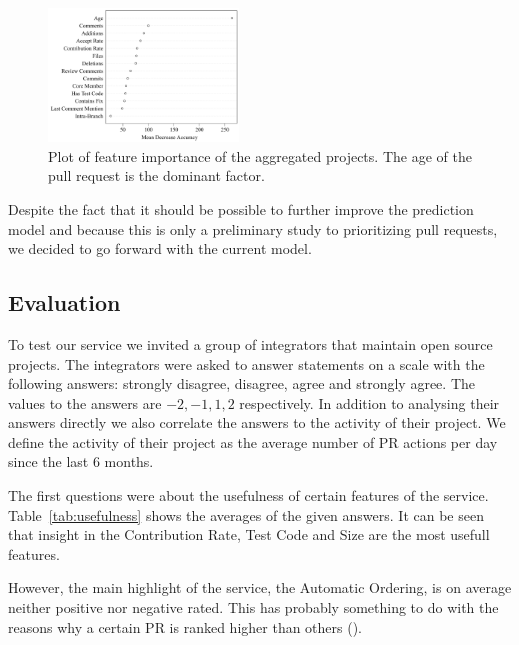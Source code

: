 \documentclass[conference]{IEEEtran}
\begin{document}
\begin{figure}
  \centering
  \includegraphics[width=0.45\textwidth]{../figs/mean-decrease-accuracy.pdf}
  \caption[Plot of feature importance]
   {Plot of feature importance of the aggregated projects. The age of the pull request is the dominant factor.}
  \label{fig:feature-importance}
\end{figure}

Despite the fact that it should be possible to further improve the prediction model and because this is only a preliminary study to prioritizing pull requests, we decided to go forward with the current model.

\subsection{Evaluation}
\label{sec:evaluation}

To test our service we invited a group of integrators that maintain open source projects.
The integrators were asked to answer statements on a scale with the following answers: strongly disagree, disagree, agree and strongly agree.
The values to the answers are ${-2, -1, 1, 2}$ respectively.
In addition to analysing their answers directly we also correlate the answers to the activity of their project.
We define the activity of their project as the average number of PR actions per day since the last 6 months.

The first questions were about the usefulness of certain features of the service.
Table~\ref{tab:usefulness} shows the averages of the given answers.
It can be seen that insight in the Contribution Rate, Test Code and Size are the most usefull features.


However, the main highlight of the service, the Automatic Ordering, is on average neither positive nor negative rated.
This has probably something to do with the reasons why a certain PR is ranked higher than others ().
\end{document}
